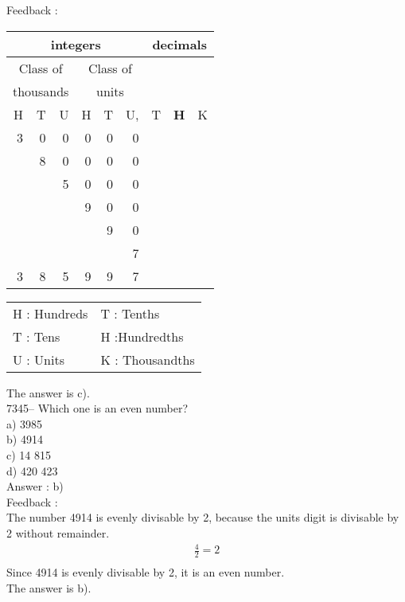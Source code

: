 \documentclass[letterpaper, 12pt]{article}
\begin{document}
Feedback :\\
\begin{center}
\begin{tabular}{|rrr|rrr|rrr|}
\hline
\multicolumn{6}{|c|}{integers} &\multicolumn{3}{|c|}{decimals} \\
\hline
\multicolumn{3}{|c|}{Class of} &\multicolumn{3}{|c|}{Class of} &  \multicolumn{3}{c|}{} \\
\multicolumn{3}{|c|}{thousands} &\multicolumn{3}{|c|}{units} &  \multicolumn{3}{c|}{} \\
\hline
H & T & U &H & T & U, & T\up{th} & \textbf{H\up{th}} & K\up{th} \\
\hline
\hline
3 & 0 & 0 & 0 & 0 & 0 & & &\\
  & 8 & 0 & 0 & 0 & 0 & & &\\
  &   & 5 & 0 & 0 & 0 & & &\\
  &   &   & 9 & 0 & 0 & & &\\
  &   &   &   & 9 & 0 & & &\\
  &   &   &   &   & 7 & & &\\
\hline
\hline
3 & 8 & 5 & 9 & 9 & 7 & & &\\
\hline
\end{tabular}
\end{center}

\scriptsize
\begin{center}
\begin{tabular}{ll}
H : Hundreds & T\up{th} : Tenths\\
T : Tens & H\up{th} :Hundredths\\
U : Units & K\up{e} : Thousandths\\
\end{tabular}
\end{center}

\normalsize
The answer is c).\\

7345-- Which one is an even number?\\

a) 3985\\
b) 4914\\
c) 14 815\\
d) 420 423\\

Answer : b)\\

Feedback :\\
The number 4914 is evenly divisable by  2, because the units digit is divisable by 2 without remainder.\\
\begin{eqnarray*}
\frac{4}{2}=2\\
\end{eqnarray*}
Since 4914 is evenly divisable by 2, it is an even number.\\
The answer is b).\\
\end{document}

